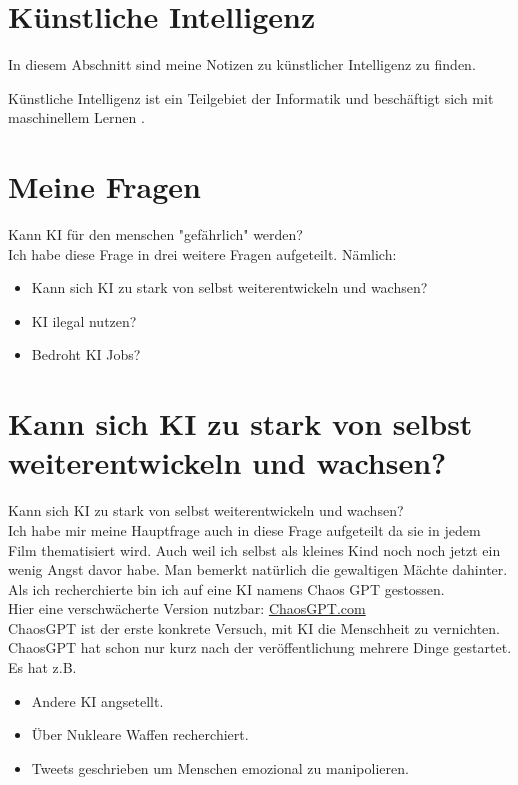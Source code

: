 \section{Künstliche Intelligenz}
\label{sec:ai}

In diesem Abschnitt sind meine Notizen zu künstlicher Intelligenz zu finden.

Künstliche Intelligenz ist ein Teilgebiet der Informatik und beschäftigt sich mit maschinellem Lernen \citep{ai-wikipedia}.
\section{Meine Fragen}
Kann KI für den menschen "gefährlich" werden?
\\
Ich habe diese Frage in drei weitere Fragen aufgeteilt.
\newline Nämlich: 
\begin{itemize}
    \item Kann sich KI zu stark von selbst weiterentwickeln und wachsen?
    \item KI ilegal nutzen?
    \item Bedroht KI Jobs?
\end{itemize}
\section{Kann sich KI zu stark von selbst weiterentwickeln und wachsen?}
Kann sich KI zu stark von selbst weiterentwickeln und wachsen?
\\
Ich habe mir meine Hauptfrage auch in diese Frage aufgeteilt da sie in jedem Film thematisiert wird. 
Auch weil ich selbst als kleines Kind noch noch jetzt ein wenig Angst davor habe. 
Man bemerkt natürlich die gewaltigen Mächte dahinter. Als ich recherchierte bin ich auf eine KI namens Chaos GPT gestossen.
\\
Hier eine verschwächerte Version nutzbar: \href{https://flowgpt.com/p/chaosgpt}{ChaosGPT.com}
\\
ChaosGPT ist der erste konkrete Versuch, mit KI die Menschheit zu vernichten. \citep{the-decoder}
ChaosGPT hat schon nur kurz nach der veröffentlichung mehrere Dinge gestartet. Es hat z.B.
\begin{itemize}
    \item Andere KI angsetellt.
    \item Über Nukleare Waffen recherchiert.
    \item Tweets geschrieben um Menschen emozional zu manipolieren.
\end{itemize}

